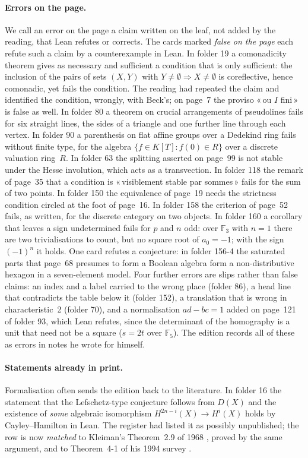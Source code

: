 \documentclass[runningheads,a4paper]{llncs}
\newcommand{\q}[1]{«\,#1\,»}
\begin{document}
\paragraph{Errors on the page.} We call an error on the page a claim written on the leaf, not added by the reading, that Lean refutes or corrects. The \cntFalsePage{} cards marked \emph{false on the page} each refute such a claim by a counterexample in Lean. In folder 19 a comonadicity theorem gives as necessary and sufficient a condition that is only sufficient: the inclusion of the pairs of sets $(X,Y)$ with $Y \neq \emptyset \Rightarrow X \neq \emptyset$ is coreflective, hence comonadic, yet fails the condition. The reading had repeated the claim and identified the condition, wrongly, with Beck's; on page~7 the proviso \q{ou $I$ fini} is false as well. In folder 80 a theorem on crucial arrangements of pseudolines fails for six straight lines, the sides of a triangle and one further line through each vertex. In folder 90 a parenthesis on flat affine groups over a Dedekind ring fails without finite type, for the algebra $\{f \in K[T] : f(0) \in R\}$ over a discrete valuation ring~$R$. In folder 63 the splitting asserted on page~99 is not stable under the Hesse involution, which acts as a transvection. In folder 118 the remark of page~35 that a condition is \q{visiblement stable par sommes} fails for the sum of two points. In folder 150 the equivalence of page~19 needs the strictness condition circled at the foot of page~16. In folder 158 the criterion of page~52 fails, as written, for the discrete category on two objects. In folder 160 a corollary that leaves a sign undetermined fails for $p$ and $n$ odd: over $\mathbb F_3$ with $n = 1$ there are two trivialisations to count, but no square root of $a_0 = -1$; with the sign $(-1)^n$ it holds. One card refutes a conjecture: in folder 156-4 the saturated parts that page~68 presumes to form a Boolean algebra form a non-distributive hexagon in a seven-element model. Four further errors are slips rather than false claims: an index and a label carried to the wrong place (folder 86), a head line that contradicts the table below it (folder 152), a translation that is wrong in characteristic~2 (folder 70), and a normalisation $ad - bc = 1$ added on page~121 of folder 93, which Lean refutes, since the determinant of the homography is a unit that need not be a square ($s = 2t$ over $\mathbb F_5$). The edition records all of these as errors in notes he wrote for himself.

\paragraph{Statements already in print.} Formalisation often sends the edition back to the literature. In folder 16 the statement that the Lefschetz-type conjecture follows from $D(X)$ and the existence of \emph{some} algebraic isomorphism $H^{2n-i}(X) \to H^i(X)$ holds by Cayley--Hamilton in Lean. The register had listed it as possibly unpublished; the row is now \emph{matched} to Kleiman's Theorem~2.9 of 1968 \cite{kleiman1968}, proved by the same argument, and to Theorem~4-1 of his 1994 survey \cite{kleiman1994}.
\end{document}
